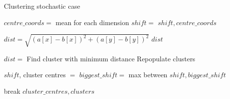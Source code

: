 \newpage
\begin{algorithm}
\caption{Clustering stochastic case}
 \begin{algorithmic}[1]
    \Statex
    
    	\Statex
    		\State $centre\_coords = $ mean for each dimension
    		\State $shift = $
    		\State \Return $shift, centre\_coords$
    	\EndFunction
    
    	\Statex
    		\State $dist = \sqrt{(a[x] - b[x])^2+(a[y] - b[y])^2}$
    		\State \Return $dist$
    	\EndFunction
      
      	\Statex
      				\State $dist = $
      			\EndFor
      			\State Find cluster with minimum distance
      			\State Repopulate clusters
      		\EndFor
      		
      			\State $shift$, cluster centres $=$ 
      			\State $biggest\_shift = $ max between $shift, biggest\_shift$
      			
      		\EndFor
      			\State break
      		\EndIf
      	\EndWhile
      \State \Return $cluster\_centres, clusters$
    \EndFunction

  \end{algorithmic}
\end{algorithm}

